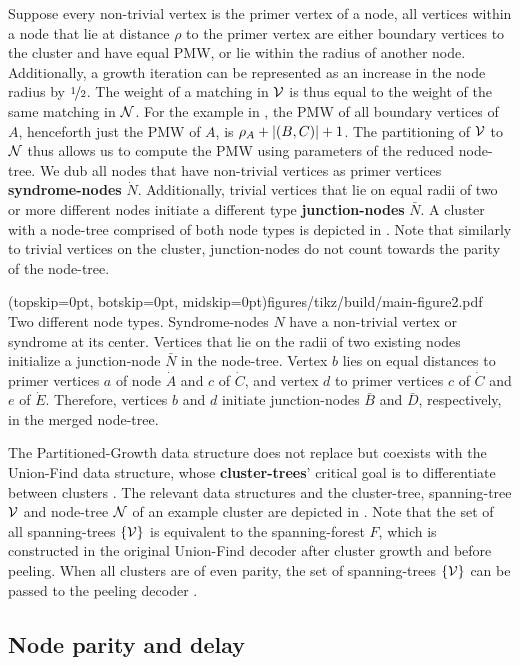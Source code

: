 Suppose every non-trivial vertex is the primer vertex of a node, all vertices within a node that lie at distance $\rho$ to the primer vertex are either boundary vertices to the cluster and have equal PMW, or lie within the radius of another node. Additionally, a growth iteration can be represented as an increase in the node radius by $\nicefrac{1}{2}$. The weight of a matching in $\mathcal{V}$ is thus equal to the weight of the same matching in $\mathcal{N}$. For the example in , the PMW of all boundary vertices of $A$, henceforth just the PMW of $A$, is $\rho_A + \lvert(B,C)\rvert +1$. The partitioning of $\mathcal{V}$ to $\mathcal{N}$ thus allows us to compute the PMW using parameters of the reduced node-tree. We dub all nodes that have non-trivial vertices as primer vertices \textbf{syndrome-nodes} $\dot{N}$. Additionally, trivial vertices that lie on equal radii of two or more different nodes initiate a different type \textbf{junction-nodes} $\bar{N}$. A cluster with a node-tree comprised of both node types is depicted in . Note that similarly to trivial vertices on the cluster, junction-nodes do not count towards the parity of the node-tree. 

\Figure[bt](topskip=0pt, botskip=0pt, midskip=0pt){figures/tikz/build/main-figure2.pdf}{
Two different node types. Syndrome-nodes $N$ have a non-trivial vertex or syndrome at its center. Vertices that lie on the radii of two existing nodes initialize a junction-node $\bar{N}$ in the node-tree. Vertex $b$ lies on equal distances to primer vertices $a$ of node $\dot{A}$ and $c$ of $\dot{C}$, and vertex $d$ to primer vertices $c$ of $\dot{C}$ and $e$ of $\dot{E}$. Therefore, vertices $b$ and $d$ initiate junction-nodes $\bar{B}$ and $\bar{D}$, respectively, in the merged node-tree. \label{fig:nodes}}

The Partitioned-Growth data structure does not replace but coexists with the Union-Find data structure, whose \textbf{cluster-trees}' critical goal is to differentiate between clusters \cite{delfosse2017almost}. The relevant data structures and the cluster-tree, spanning-tree $\mathcal{V}$ and node-tree $\mathcal{N}$ of an example cluster are depicted in . Note that the set of all spanning-trees $\{\mathcal{V}\}$ is equivalent to the spanning-forest $F$, which is constructed in the original Union-Find decoder after cluster growth and before peeling. When all clusters are of even parity, the set of spanning-trees $\{\mathcal{V}\}$ can be passed to the peeling decoder \cite{delfosse2017linear}. 


\subsection{Node parity and delay}\label{sec:paritydelay}

